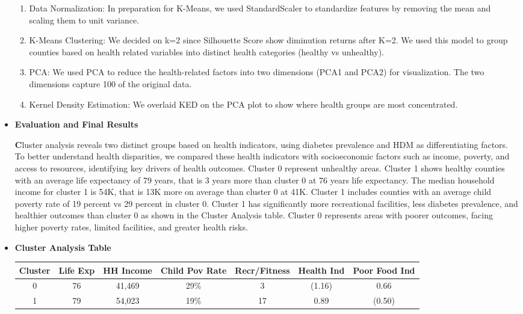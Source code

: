 \documentclass{article}
\begin{document}
\begin{itemize}[leftmargin=0pt]
\begin{enumerate}
    \item Data Normalization: In preparation for K-Means, we used StandardScaler to standardize features by removing the mean and scaling them to unit variance.
    \item K-Means Clustering: We decided on k=2 since Silhouette Score show diminution returns after K=2. We used this model to group counties based on health related variables into distinct health categories (healthy vs unhealthy).
    \item PCA: We used PCA to reduce the health-related factors into two dimensions (PCA1 and PCA2) for visualization. The two dimensions capture 100 of the original data.
    \item Kernel Density Estimation: We overlaid KED on the PCA plot to show where health groups are most concentrated.
\end{enumerate}

\item[] \textbf{Evaluation and Final Results}

\textbf Cluster analysis reveals two distinct groups based on health indicators, using diabetes prevalence and HDM as differentiating factors. To better understand health disparities, we compared these health indicators with socioeconomic factors such as income, poverty, and access to resources, identifying key drivers of health outcomes. Cluster 0 represent unhealthy areas. Cluster 1 shows healthy counties with an average life expectancy of 79 years, that is 3 years more than cluster 0 at 76 years life expectancy. The median household income for cluster 1 is 54K, that is 13K more on average than cluster 0 at 41K. Cluster 1 includes counties with an average child poverty rate of 19 percent vs 29 percent in cluster 0. Cluster 1 has significantly more recreational facilities, less diabetes prevalence, and healthier outcomes than cluster 0 as shown in the Cluster Analysis table. Cluster 0 represents areas with poorer outcomes, facing higher poverty rates, limited facilities, and greater health risks.

\item[] \textbf{Cluster Analysis Table}

\begin{tabular}{|c|c|c|c|c|c|c|}
\hline
\textbf{Cluster} & \textbf{Life Exp} & \textbf{HH Income} & \textbf{Child Pov Rate} & \textbf{Recr/Fitness} & \textbf{Health Ind} & \textbf{Poor Food Ind} \\ \hline
0 & 76 & 41,469 & 29\% & 3 & (1.16) & 0.66 \\ \hline
1 & 79 & 54,023 & 19\% & 17 & 0.89 & (0.50) \\ \hline


\end{tabular}
\end{itemize}
\end{document}
